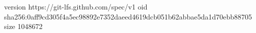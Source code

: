 version https://git-lfs.github.com/spec/v1
oid sha256:0aff9cd305f4a5ec98892e7352daeed4619dcb051b62abbae5da1d70ebb88705
size 1048672
